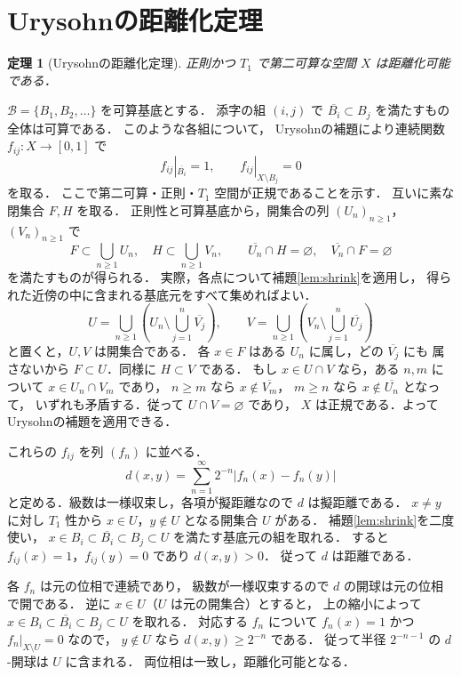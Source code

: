 \documentclass[a5paper,10pt,onecolumn]{jsarticle}
\makeatletter
\theoremstyle{mathnotetheorem}
\newtheorem{theorem}{定理}[section]
\renewcommand{\proofname}{証明}
\renewenvironment{proof}[1][\proofname]{%
  \par\pushQED{\qed}\normalfont\topsep4\p@\@plus2\p@\relax
  \trivlist\item[\hskip\labelsep\bfseries #1]\ignorespaces
}{\popQED\endtrivlist\@endpefalse}
\makeatother
\begin{document}
\section{Urysohnの距離化定理}
\begin{theorem}[Urysohnの距離化定理]\label{thm:urysohn-metric}
正則かつ $T_1$ で第二可算な空間 $X$ は距離化可能である．
\end{theorem}
\begin{proof}
$\mathcal B=\{B_1,B_2,\dots\}$ を可算基底とする．
添字の組 $(i,j)$ で
$\overline{B_i}\subset B_j$ を満たすもの全体は可算である．
このような各組について，
Urysohnの補題により連続関数
$f_{ij}:X\to[0,1]$ で
\[
 f_{ij}|_{\overline{B_i}}=1,\qquad
 f_{ij}|_{X\setminus B_j}=0
\]
を取る．
ここで第二可算・正則・$T_1$ 空間が正規であることを示す．
互いに素な閉集合 $F,H$ を取る．
正則性と可算基底から，開集合の列 $(U_n)_{n\ge1}$，
$(V_n)_{n\ge1}$ で
\[
 F\subset\bigcup_{n\ge1}U_n,\quad
 H\subset\bigcup_{n\ge1}V_n,\qquad
 \overline{U_n}\cap H=\varnothing,\quad
 \overline{V_n}\cap F=\varnothing
\]
を満たすものが得られる．
実際，各点について補題\ref{lem:shrink}を適用し，
得られた近傍の中に含まれる基底元をすべて集めればよい．
\[
 U=\bigcup_{n\ge1}\left(U_n\setminus\bigcup_{j=1}^{n}
       \overline{V_j}\right),\qquad
 V=\bigcup_{n\ge1}\left(V_n\setminus\bigcup_{j=1}^{n}
       \overline{U_j}\right)
\]
と置くと，$U,V$ は開集合である．
各 $x\in F$ はある $U_n$ に属し，どの $\overline{V_j}$ にも
属さないから $F\subset U$．同様に $H\subset V$ である．
もし $x\in U\cap V$ なら，ある $n,m$ について
$x\in U_n\cap V_m$ であり，
$n\ge m$ なら $x\notin\overline{V_m}$，
$m\ge n$ なら $x\notin\overline{U_n}$ となって，
いずれも矛盾する．従って $U\cap V=\varnothing$ であり，
$X$ は正規である．よってUrysohnの補題を適用できる．

これらの $f_{ij}$ を列 $(f_n)$ に並べる．
\[
 d(x,y)=\sum_{n=1}^\infty2^{-n}|f_n(x)-f_n(y)|
\]
と定める．級数は一様収束し，各項が擬距離なので
$d$ は擬距離である．
$x\ne y$ に対し $T_1$ 性から
$x\in U$，$y\notin U$ となる開集合 $U$ がある．
補題\ref{lem:shrink}を二度使い，
$x\in B_i\subset\overline{B_i}\subset B_j\subset U$
を満たす基底元の組を取れる．
すると $f_{ij}(x)=1$，$f_{ij}(y)=0$ であり $d(x,y)>0$．
従って $d$ は距離である．

各 $f_n$ は元の位相で連続であり，
級数が一様収束するので $d$ の開球は元の位相で開である．
逆に $x\in U$（$U$ は元の開集合）とすると，
上の縮小によって
$x\in B_i\subset\overline{B_i}\subset B_j\subset U$
を取れる．
対応する $f_n$ について
$f_n(x)=1$ かつ $f_n|_{X\setminus U}=0$ なので，
$y\notin U$ なら $d(x,y)\ge2^{-n}$ である．
従って半径 $2^{-n-1}$ の $d$-開球は $U$ に含まれる．
両位相は一致し，距離化可能となる．
\end{proof}
\end{document}
